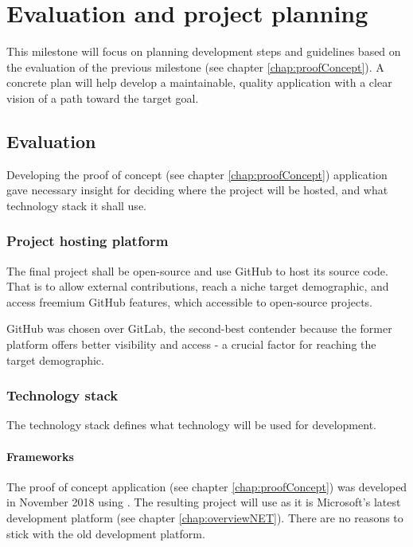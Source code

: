 \chapter{Evaluation and project planning} \label{chap:evalProjPlan}

This milestone will focus on planning development steps and guidelines based on the evaluation of the previous milestone (see chapter \ref{chap:proofConcept}).
A concrete plan will help develop a maintainable, quality application with a clear vision of a path toward the target goal.

\section{Evaluation}

Developing the proof of concept (see chapter \ref{chap:proofConcept}) application gave necessary insight for deciding where the project will be hosted, and what technology stack it shall use.


\subsection{Project hosting platform}

The final project shall be open-source and use GitHub to host its source code.
That is to allow external contributions, reach a niche target demographic, and access freemium GitHub features, which accessible to open-source projects.

GitHub was chosen over GitLab, the second-best contender because the former platform offers better visibility and access - a crucial factor for reaching the target demographic.

\subsection{Technology stack}

The technology stack defines what technology will be used for development.

\subsubsection{Frameworks}

The proof of concept application (see chapter \ref{chap:proofConcept}) was developed in November 2018 using . The resulting project will use  as it is Microsoft's latest development platform (see chapter \ref{chap:overviewNET}). There are no reasons to stick with the old development platform.


